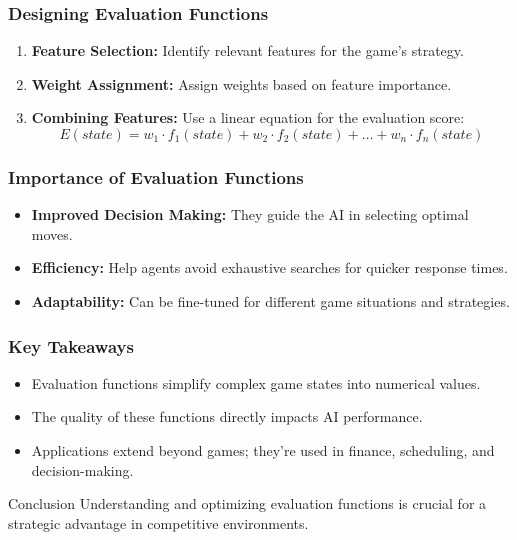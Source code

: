 \documentclass[aspectratio=169]{beamer}
\begin{document}
\begin{frame}[fragile]
    \frametitle{Designing Evaluation Functions}
    \begin{enumerate}
        \item \textbf{Feature Selection:} Identify relevant features for the game's strategy.
        \item \textbf{Weight Assignment:} Assign weights based on feature importance.
        \item \textbf{Combining Features:} Use a linear equation for the evaluation score:
        \begin{equation}
        E(state) = w_1 \cdot f_1(state) + w_2 \cdot f_2(state) + \ldots + w_n \cdot f_n(state)
        \end{equation}
    \end{enumerate}
\end{frame}

\begin{frame}[fragile]
    \frametitle{Importance of Evaluation Functions}
    \begin{itemize}
        \item \textbf{Improved Decision Making:} They guide the AI in selecting optimal moves.
        \item \textbf{Efficiency:} Help agents avoid exhaustive searches for quicker response times.
        \item \textbf{Adaptability:} Can be fine-tuned for different game situations and strategies.
    \end{itemize}
\end{frame}

\begin{frame}[fragile]
    \frametitle{Key Takeaways}
    \begin{itemize}
        \item Evaluation functions simplify complex game states into numerical values.
        \item The quality of these functions directly impacts AI performance.
        \item Applications extend beyond games; they're used in finance, scheduling, and decision-making.
    \end{itemize}
    \begin{block}{Conclusion}
        Understanding and optimizing evaluation functions is crucial for a strategic advantage in competitive environments.
    \end{block}
\end{frame}
\end{document}

